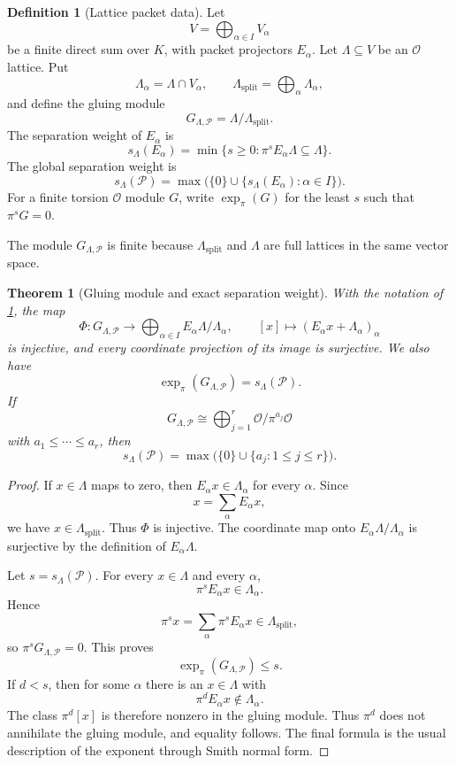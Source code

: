 \documentclass[11pt,a4paper]{article}
\newtheorem{theorem}{Theorem}[section]
\theoremstyle{definition}
\newtheorem{definition}[definition]{Definition}
\theoremstyle{remark}
\newcommand{\OO}{\mathcal O}
\newcommand{\Pcal}{\mathcal P}
\newcommand{\expn}{\operatorname{exp}}
\providecommand{\OO}{\mathcal O}
\theoremstyle{definition}\newtheorem{construction}[theorem]{Construction}\newtheorem{certificate}[theorem]{Numerical Certificate}
\theoremstyle{remark}\newtheorem{boundary}[theorem]{Boundary}
\begin{document}
\begin{definition}[Lattice packet data]\label{def:lattice_packet}
Let
\[
V=\bigoplus_{\alpha\in I}V_\alpha
\]
be a finite direct sum over $K$, with packet projectors $E_\alpha$.  Let $\Lambda\subseteq V$ be an $\OO$ lattice.  Put
\[
\Lambda_\alpha=\Lambda\cap V_\alpha,
\qquad
\Lambda_{\mathrm{split}}=\bigoplus_\alpha\Lambda_\alpha,
\]
and define the gluing module
\[
G_{\Lambda,\Pcal}
=
\Lambda/\Lambda_{\mathrm{split}}.
\]
The separation weight of $E_\alpha$ is
\[
s_\Lambda(E_\alpha)
=
\min\{s\geq0:\pi^sE_\alpha\Lambda\subseteq\Lambda\}.
\]
The global separation weight is
\[
s_\Lambda(\Pcal)=\max\bigl(\{0\}\cup\{s_\Lambda(E_\alpha):\alpha\in I\}\bigr).
\]
For a finite torsion $\OO$ module $G$, write $\expn_\pi(G)$ for the least $s$ such that $\pi^sG=0$.
\end{definition}

The module $G_{\Lambda,\Pcal}$ is finite because $\Lambda_{\mathrm{split}}$ and $\Lambda$ are full lattices in the same vector space.

\begin{theorem}[Gluing module and exact separation weight]\label{thm:gluing_weight}
With the notation of \cref{def:lattice_packet}, the map
\[
\Phi:G_{\Lambda,\Pcal}
\longrightarrow
\bigoplus_{\alpha\in I}E_\alpha\Lambda/\Lambda_\alpha,
\qquad
[x]\longmapsto(E_\alpha x+\Lambda_\alpha)_\alpha
\]
is injective, and every coordinate projection of its image is surjective.  We also have
\[
\boxed{
\expn_\pi(G_{\Lambda,\Pcal})
=
s_\Lambda(\Pcal).
}
\]
If
\[
G_{\Lambda,\Pcal}
\cong
\bigoplus_{j=1}^r\OO/\pi^{a_j}\OO
\]
with $a_1\leq\cdots\leq a_r$, then
\[
s_\Lambda(\Pcal)=\max\bigl(\{0\}\cup\{a_j:1\leq j\leq r\}\bigr).
\]
\end{theorem}

\begin{proof}
If $x\in\Lambda$ maps to zero, then $E_\alpha x\in\Lambda_\alpha$ for every $\alpha$.  Since
\[
x=\sum_\alpha E_\alpha x,
\]
we have $x\in\Lambda_{\mathrm{split}}$.  Thus $\Phi$ is injective.  The coordinate map onto $E_\alpha\Lambda/\Lambda_\alpha$ is surjective by the definition of $E_\alpha\Lambda$.

Let $s=s_\Lambda(\Pcal)$.  For every $x\in\Lambda$ and every $\alpha$,
\[
\pi^sE_\alpha x\in\Lambda_\alpha.
\]
Hence
\[
\pi^sx=\sum_\alpha\pi^sE_\alpha x\in\Lambda_{\mathrm{split}},
\]
so $\pi^sG_{\Lambda,\Pcal}=0$.  This proves
\[
\expn_\pi(G_{\Lambda,\Pcal})\leq s.
\]
If $d<s$, then for some $\alpha$ there is an $x\in\Lambda$ with
\[
\pi^dE_\alpha x\notin\Lambda_\alpha.
\]
The class $\pi^d[x]$ is therefore nonzero in the gluing module.  Thus $\pi^d$ does not annihilate the gluing module, and equality follows.  The final formula is the usual description of the exponent through Smith normal form.
\end{proof}
\end{document}
